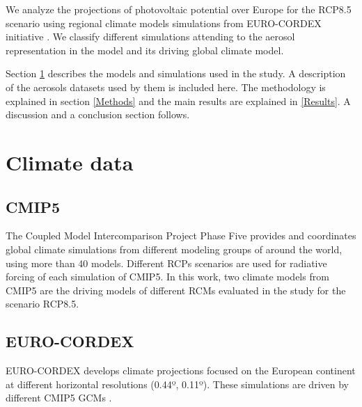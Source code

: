    We analyze the projections of photovoltaic potential over Europe for the RCP8.5 scenario using regional climate models simulations from EURO-CORDEX initiative \cite*{Jacob2014}. We classify different simulations attending to the aerosol representation in the model and its driving global climate model.

   Section \ref{Climate data} describes the models and simulations used in the study. A description of the aerosols datasets used by them is included here. The methodology is explained in section \ref{Methods} and the main results are explained in \ref{Results}. A discussion and a conclusion section follows.

{\section{Climate data}\label{Climate data}}

\subsection{CMIP5}

The Coupled Model Intercomparison Project Phase Five provides and coordinates global climate simulations from different modeling groups \cite*{Taylor2012} of around the world, using more than 40 models. Different RCPs scenarios are used for radiative forcing of each simulation of CMIP5. In this work, two climate models from CMIP5 are the driving models of different RCMs evaluated in the study for the scenario RCP8.5.

\subsection{EURO-CORDEX}


EURO-CORDEX develops climate projections focused on the European continent at different horizontal resolutions (0.44º, 0.11º). These simulations are driven by different CMIP5 GCMs \cite*{Taylor2012}.

